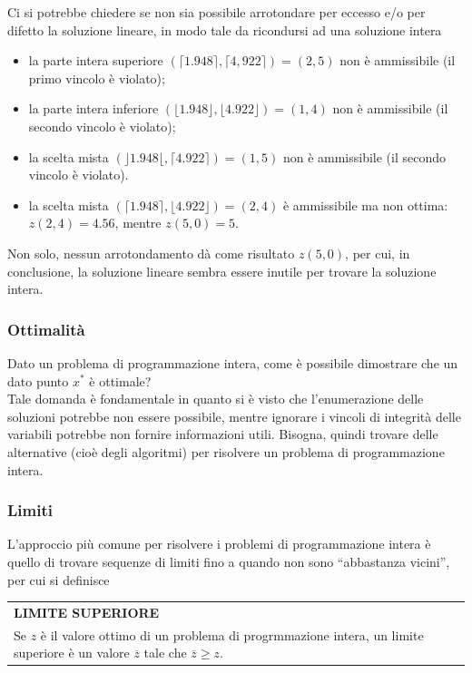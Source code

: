 \documentclass[a4paper]{extarticle}
\newcommand{\quotes}[1]{``#1''}
\renewcommand\arraystretch{}
\begin{document}
\vspace{1em}
\noindent
Ci si potrebbe chiedere se non sia possibile arrotondare per eccesso e/o per difetto la soluzione lineare, in modo tale da ricondursi ad una soluzione intera
\begin{itemize}
    \item la parte intera superiore $(\lceil 1.948 \rceil,\lceil 4,922 \rceil) = (2, 5)$ non è ammissibile (il primo vincolo è violato);
    \item la parte intera inferiore $(\lfloor 1.948 \rfloor, \lfloor 4.922 \rfloor) = (1, 4)$ non è ammissibile (il secondo vincolo è violato);
    \item la scelta mista $(\rfloor 1.948 \lfloor, \lceil 4.922 \rceil) = (1, 5)$ non è ammissibile (il secondo vincolo è violato).
    \item la scelta mista $(\lceil 1.948 \rceil, \lfloor 4.922 \rfloor) = (2, 4)$ è ammissibile ma non ottima: $z(2, 4) = 4.56$, mentre $z(5, 0) = 5$. 
\end{itemize}
Non solo, nessun arrotondamento dà come risultato $z(5, 0)$, per cui, in conclusione, la soluzione lineare sembra essere inutile per trovare la soluzione intera.

\vspace{1em}
\subsubsection{Ottimalità}
Dato un problema di programmazione intera, come è possibile dimostrare che un dato punto $x^*$ è ottimale?\\
Tale domanda è fondamentale in quanto si è visto che l'enumerazione delle soluzioni potrebbe non essere possibile, mentre ignorare i vincoli di integrità delle variabili potrebbe non fornire informazioni utili.
Bisogna, quindi trovare delle alternative (cioè degli algoritmi) per risolvere un problema di programmazione intera.

\vspace{1em}
\subsubsection{Limiti}
L'approccio più comune per risolvere i problemi di programmazione intera è quello di trovare sequenze di limiti fino a quando non sono \quotes{abbastanza vicini}, per cui si definisce

\vspace{1em}
\setlength{\tabcolsep}{14pt}
\renewcommand{\arraystretch}{2}
\noindent
\begin{tabularx}{\textwidth}{@{}|P|@{}}
    \hline
    {\textbf{LIMITE SUPERIORE}}\\
    \parbox{\linewidth}{Se $z$ è il valore ottimo di un problema di progrmmazione intera, un limite superiore è un valore $\overline{z}$ tale che $\overline{z} \geq z$. \vspace{3mm}}\\
    \hline
\end{tabularx}
\end{document}
